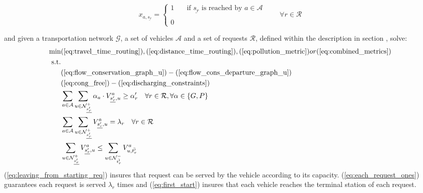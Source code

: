 \begin{equation*}
	x_{a,\underline{s_r} }= 
	\begin{cases} 
		1 & \quad \text{if $\underline{s_r} $ is reached by }  a \in \mathcal{A}\\
		\\
		0
	\end{cases}
	\quad\quad \forall r \in \mathcal{R}
	\label{eq:var_dispatching}
\end{equation*}

 and given a transportation network $\mathcal{G}$, a set of vehicles $\mathcal{A}$ and a set of requests $\mathcal{R}$, defined within the description in section , solve:\\
\begin{align}
	\text{min}&  
		(\ref{eq:travel_time_routing}), (\ref{eq:distance_time_routing}), (\ref{eq:pollution_metric}) or (\ref{eq:combined_metrics})
	\nonumber\\
	\text{s.t.} &\nonumber\\
	&(\ref{eq:flow_conservation_graph_u})-(\ref{eq:flow_cons_departure_graph_u})\nonumber\\
	&(\ref{eq:cong_free})-(\ref{eq:discharging_constraints})\nonumber\\
	&\sum_{ a \in \mathcal{A} }
	\sum_{u \in \mathcal{N}^+_{\underline{s'_r}} } \alpha_a \cdot V^a_{ \underline{s'_r}, u} \ge \alpha'_r \quad \forall r \in \mathcal{R}, \forall \alpha \in \{G, P\}	\label{eq:leaving_from_starting_req}\\
	&\sum_{ a \in \mathcal{A} }\sum_{u \in \mathcal{N}^+_{\underline{s'_r}} } V^a_{ \underline{s'_r}, u} =\lambda_r\quad \forall r \in \mathcal{R}	\label{eq:each_request_ones}\\
	&\sum_{u \in \mathcal{N}^+_{\underline{s'_r}} }  V^a_{ \underline{s'_r}, u} \leq \sum_{u \in \mathcal{N}^-_{\bar{t'_r}} }  V^a_{u,\bar{t'_r}} \label{eq:first_start}
\end{align}
(\ref{eq:leaving_from_starting_req}) insures that request can be served by the vehicle according to its capacity. (\ref{eq:each_request_ones}) guarantees each request is served $\lambda_r$ times and (\ref{eq:first_start}) insures that each vehicle reaches the terminal station of each request. 
